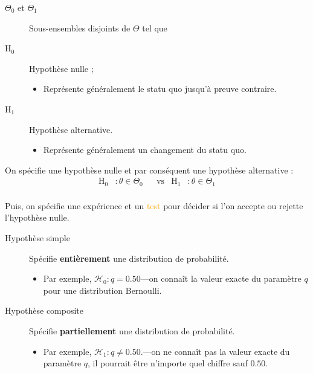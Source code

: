 \documentclass[10pt, french]{article}
\begin{document}
\begin{multicols*}{2}
\begin{distributions}[Notation]
\begin{description}
	\item[$\Theta_{0}$ et $\Theta_{1}$]	Sous-ensembles disjoints de $\Theta$ tel que 
	\item[$\textrm{H}_{0}$]	Hypothèse nulle ;
		\begin{itemize}
		\item	Représente généralement le statu quo jusqu'à preuve contraire.
		\end{itemize}
	\item[$\textrm{H}_{1}$]	Hypothèse alternative.
		\begin{itemize}
		\item	Représente généralement un changement du statu quo.
		\end{itemize}
\end{description}
\end{distributions}

\begin{definitionNOHFILL}
On spécifie une \textcolor{burntorange}{hypothèse} nulle et par conséquent une hypothèse alternative :
\begin{align*}
	\textrm{H}_{0}
	&:	\theta \in \Theta_{0}	&
	&\text{vs}	&
	\textrm{H}_{1}
	&:	\theta \in \Theta_{1}	\\
\end{align*}

Puis, on spécifie une \textcolor{orange-red}{expérience} et un \textcolor{orange}{test} pour décider si l'on accepte ou rejette l'hypothèse nulle.
\end{definitionNOHFILL}

\begin{distributions}[Terminologie]
\begin{description}
\item[\hypertarget{hyp-simple}{Hypothèse simple}]	Spécifie \textbf{entièrement} une distribution de probabilité.
	\begin{itemize}
	\item	Par exemple, $\mathcal{H}_{0}	:	q = 0.50$---on connaît la valeur exacte du paramètre $q$ pour une distribution Bernoulli.
	\end{itemize}
\item[Hypothèse composite]	Spécifie \textbf{partiellement} une distribution de probabilité.
	\begin{itemize}
	\item	Par exemple, $\mathcal{H}_{1}	:	q \neq 0.50$.---on ne connaît pas la valeur exacte du paramètre $q$, il pourrait être n'importe quel chiffre sauf $0.50$.
	\end{itemize}
\end{description}
\end{distributions}


\end{multicols*}
\end{document}
